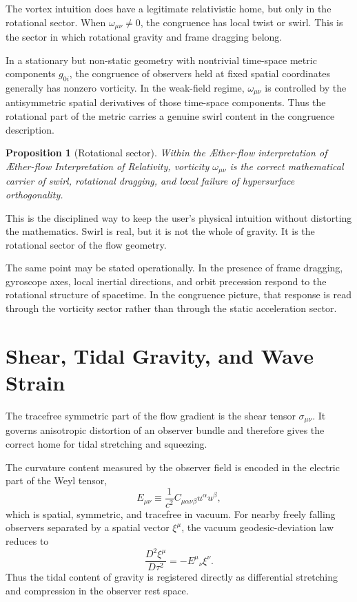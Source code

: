 \documentclass[11pt]{article}
\newcommand{\Aflow}{\AE{}ther-flow}
\newcommand{\TheoryName}{\Aflow{} Interpretation of Relativity}
\newtheorem{proposition}{Proposition}
\begin{document}
The vortex intuition does have a legitimate relativistic home, but only in the rotational sector. When \(\omega_{\mu\nu}\neq 0\), the congruence has local twist or swirl. This is the sector in which rotational gravity and frame dragging belong.

In a stationary but non-static geometry with nontrivial time-space metric components \(g_{0i}\), the congruence of observers held at fixed spatial coordinates generally has nonzero vorticity. In the weak-field regime, \(\omega_{\mu\nu}\) is controlled by the antisymmetric spatial derivatives of those time-space components. Thus the rotational part of the metric carries a genuine swirl content in the congruence description.

\begin{proposition}[Rotational sector]
Within the \Aflow{} interpretation of \TheoryName{}, vorticity \(\omega_{\mu\nu}\) is the correct mathematical carrier of swirl, rotational dragging, and local failure of hypersurface orthogonality.
\end{proposition}

This is the disciplined way to keep the user's physical intuition without distorting the mathematics. Swirl is real, but it is not the whole of gravity. It is the rotational sector of the flow geometry.

The same point may be stated operationally. In the presence of frame dragging, gyroscope axes, local inertial directions, and orbit precession respond to the rotational structure of spacetime. In the congruence picture, that response is read through the vorticity sector rather than through the static acceleration sector.

\section{Shear, Tidal Gravity, and Wave Strain}

The tracefree symmetric part of the flow gradient is the shear tensor \(\sigma_{\mu\nu}\). It governs anisotropic distortion of an observer bundle and therefore gives the correct home for tidal stretching and squeezing.

The curvature content measured by the observer field is encoded in the electric part of the Weyl tensor,
\begin{equation}
E_{\mu\nu}
\equiv
\frac{1}{c^2}C_{\mu\alpha\nu\beta}u^\alpha u^\beta,
\label{eq:weylelectric}
\end{equation}
which is spatial, symmetric, and tracefree in vacuum. For nearby freely falling observers separated by a spatial vector \(\xi^\mu\), the vacuum geodesic-deviation law reduces to
\begin{equation}
\frac{D^2 \xi^\mu}{D\tau^2}
=
-E^\mu{}_{\nu}\xi^\nu.
\label{eq:geodesicdeviation}
\end{equation}
Thus the tidal content of gravity is registered directly as differential stretching and compression in the observer rest space.
\end{document}
